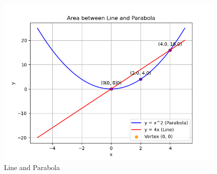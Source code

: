 \documentclass[journal]{IEEEtran}
\begin{document}
   \begin{figure}[h!]
   \centering
   \includegraphics[width=0.7\linewidth]{figs/parab.png}
	\caption{Line and Parabola}
   \end{figure}
\end{document}

